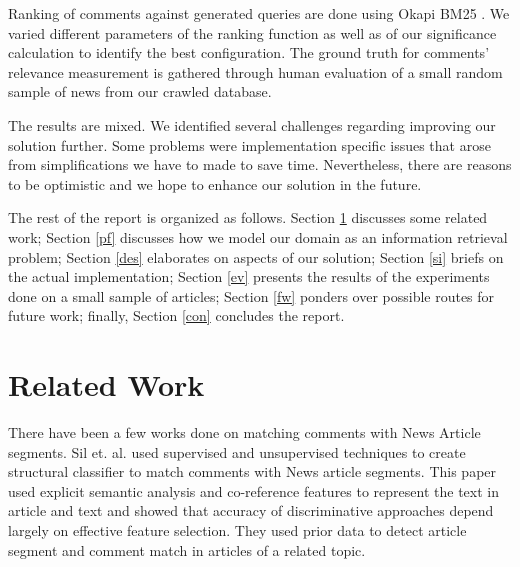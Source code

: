 \documentclass[article]{IEEEtran}
\begin{document}
Ranking of comments against generated queries are done using Okapi BM25 \cite{Robertson96okapiat}. We varied different parameters of the ranking function as well as of our significance calculation to identify the best configuration. The ground truth for comments' relevance measurement is gathered through human evaluation of a small random sample of news from our crawled database.

The results are mixed. We identified several challenges regarding improving our solution further. Some problems were implementation specific issues that arose from simplifications we have to made to save time. Nevertheless, there are reasons to be optimistic and we hope to enhance our solution in the future.

The rest of the report is organized as follows. Section \ref{rw} discusses some related work; Section \ref{pf} discusses how we model our domain as an information retrieval problem; Section \ref{des} elaborates on aspects of our solution; Section \ref{si} briefs on the actual implementation; Section \ref{ev} presents the results of the experiments done on a small sample of articles; Section \ref{fw} ponders over possible routes for future work; finally, Section \ref{con} concludes the report.                

\section{Related Work}
\label{rw}
There have been a few works done on matching comments with News Article segments. Sil et. al. \cite{Sil:2011:SMC:2063576.2063906} used supervised and unsupervised techniques to create structural classifier to match comments with News article segments. This paper used explicit semantic analysis and co-reference features to represent the text in article and text and showed that accuracy of discriminative approaches depend largely on effective feature selection. They used prior data to detect article segment and comment match in articles of a related topic.
\end{document}
